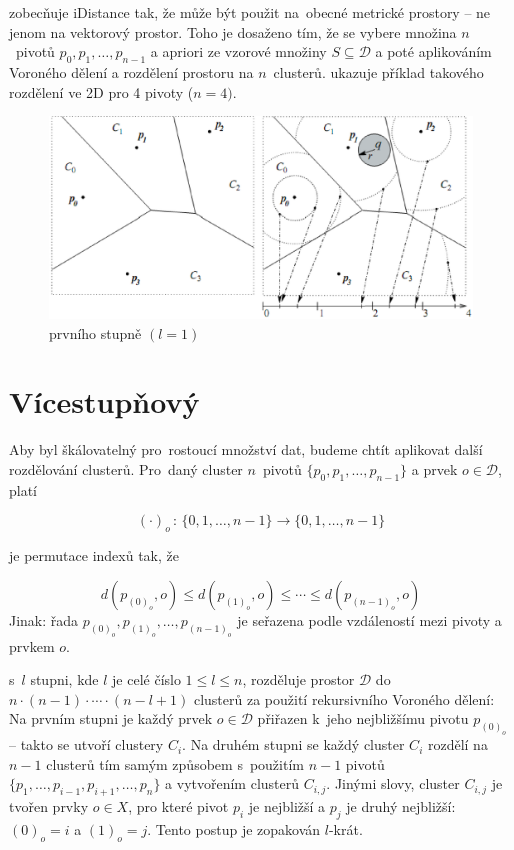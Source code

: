 \MIndex{} zobecňuje iDistance tak, že může být použit na~obecné metrické prostory -- ne jenom na vektorový prostor.
Toho je dosaženo tím, že se vybere množina $n$~pivotů $p_{0},p_{1},\ldots,p_{n-1}$ a apriori ze vzorové množiny $S\subseteq\mathcal{D}$ a poté aplikováním Voroného dělení a rozdělení prostoru na $n$~clusterů.  ukazuje příklad takového rozdělení ve 2D pro 4 pivoty ($n=4)$.

\begin{figure}[t]
\center
\includegraphics[scale=0.5]{m-index-level-one}
\caption{\MIndex{} prvního stupně $(l=1)$}
\label{fig:M-Index-level-one}
\end{figure}

\section{Vícestupňový \MIndex{}}

Aby byl \MIndex{} škálovatelný pro~rostoucí množství dat, budeme chtít
aplikovat další rozdělování clusterů. Pro~daný cluster $n$~pivotů
$\{p_{0},p_{1},\ldots,p_{n-1}\}$ a prvek $o\in\mathcal{D}$, platí

\[
(\cdot)_{o}\,:\,\{0,1,\ldots,n-1\}\rightarrow\{0,1,\ldots,n-1\}
\]

je permutace indexů tak, že

\[
d(p_{(0)_{o}},o)\leq d(p_{(1)_{o}},o)\leq\cdots\leq d(p_{(n-1)_{o}},o)
\]
Jinak: řada $p_{(0)_{o}},p_{(1)_{o}},\ldots,p_{(n-1)_{o}}$ je seřazena
podle vzdáleností mezi pivoty a prvkem $o$\@.

\MIndex{} s~$l$ stupni, kde $l$ je celé číslo $1\leq l\leq n$, rozděluje
prostor $\mathcal{D}$ do $n\cdot(n-1)\cdot\cdots\cdot(n-l+1)$ clusterů
za použití rekursivního Voroného dělení: Na prvním stupni je každý
prvek $o\in\mathcal{D}$ přiřazen k~jeho nejbližšímu pivotu $p_{(0)_{o}}$ --
takto se utvoří clustery $C_{i}$\@.
Na druhém stupni se každý cluster
$C_{i}$ rozdělí na $n-1$ clusterů tím samým způsobem s~použitím
$n-1$ pivotů $\{p_{1},\ldots,p_{i-1},p_{i+1},\ldots,p_{n}\}$ a vytvořením
clusterů $C_{i,j}$\@. Jinými slovy, cluster $C_{i,j}$ je tvořen
prvky $o\in X$, pro které pivot $p_{i}$ je nejbližší a $p_{j}$
je druhý nejbližší: $(0)_{o}=i$ a $(1)_{o}=j$\@.
Tento postup je zopakován $l$-krát\@.

